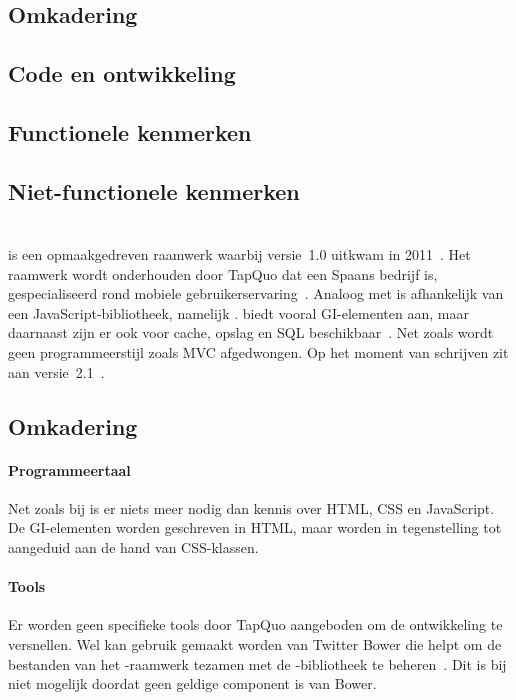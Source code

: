 \section{\kendo}
\label{sec:raamwerk-kendo}

\subsection{Omkadering}
\subsection{Code en ontwikkeling}
\subsection{Functionele kenmerken}
\subsection{Niet-functionele kenmerken}

\section{\lungo}
\label{sec:raamwerk-lungo}

\lungo{} is een opmaakgedreven raamwerk waarbij versie~1.0 uitkwam in 2011~\cite{TapQuo2011}.
Het raamwerk wordt onderhouden door TapQuo dat een Spaans bedrijf is, gespecialiseerd rond mobiele gebruikerservaring~\cite{TapQuo2013a}.
Analoog met \jqm{} is \lungo{} afhankelijk van een JavaScript-bibliotheek, namelijk \quo{}.
\lungo{} biedt vooral GI-elementen aan, maar daarnaast zijn er ook  voor cache, opslag en SQL beschikbaar~\cite{TapQuo2013}.
Net zoals \jqm{} wordt geen programmeerstijl zoals MVC afgedwongen.
Op het moment van schrijven zit \lungo{} aan versie~2.1~\cite{TapQuo2013}.

\subsection{Omkadering}
\paragraph{Programmeertaal}
Net zoals bij \jqm{} is er niets meer nodig dan kennis over HTML, CSS en JavaScript.
De GI-elementen worden geschreven in HTML, maar worden in tegenstelling tot \jqm{} aangeduid aan de hand van CSS-klassen.

\paragraph{Tools}
Er worden geen specifieke tools door TapQuo aangeboden om de ontwikkeling te versnellen.
Wel kan gebruik gemaakt worden van Twitter Bower die helpt om de bestanden van het \lungo{}-raamwerk tezamen met de \quo{}-bibliotheek te beheren~\cite{Twitter2013}.
Dit is bij \jqm{} niet mogelijk doordat \jqm{} geen geldige component is van Bower.


